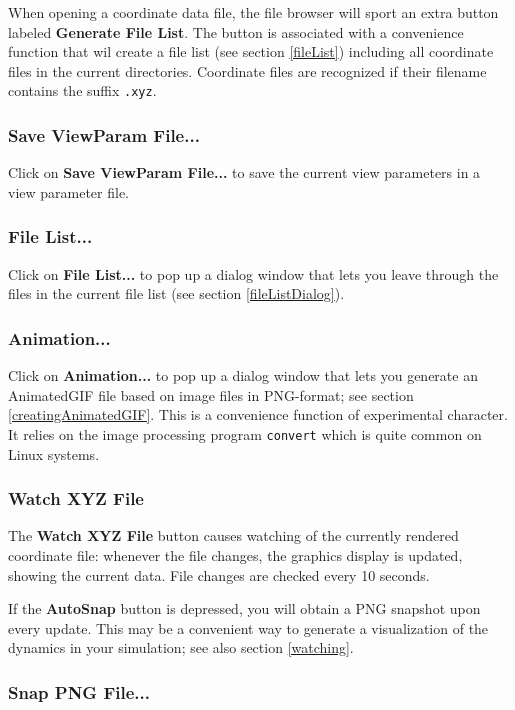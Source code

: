 \documentclass[11pt]{article}
\begin{document}
When opening a coordinate data file, the file browser will sport an extra 
button labeled {\bf Generate File List}.  The button is associated with 
a convenience function that wil create a file list (see section \ref{fileList})
including all coordinate files in the current directories.  Coordinate files 
are recognized if their filename contains the suffix {\tt .xyz}.

\subsubsection{Save ViewParam File...}

Click on {\bf Save ViewParam File...} to save the current view parameters in a
view parameter file.   

\subsubsection{File List...}

Click on {\bf File List...} to pop up a dialog window that lets you leave
through the files in the current file list (see section \ref{fileListDialog}).

\subsubsection{Animation...}

Click on {\bf Animation...} to pop up a dialog window that lets you generate an
AnimatedGIF file based on image files in PNG-format; see section
\ref{creatingAnimatedGIF}.  This is a convenience function of experimental
character.  It relies on the image processing program {\tt convert} which is
quite common on Linux systems.

\subsubsection{Watch XYZ File}

The {\bf Watch XYZ File} button causes watching of the currently rendered
coordinate file: whenever the file changes, the graphics display is updated, 
showing the current data.  File changes are checked every 10 seconds.  

If the {\bf AutoSnap} button is depressed, you will obtain a PNG snapshot
upon every update.  This may be a convenient way to generate a visualization
of the dynamics in your simulation; see also section \ref{watching}.

\subsubsection{Snap PNG File...}
\end{document}
